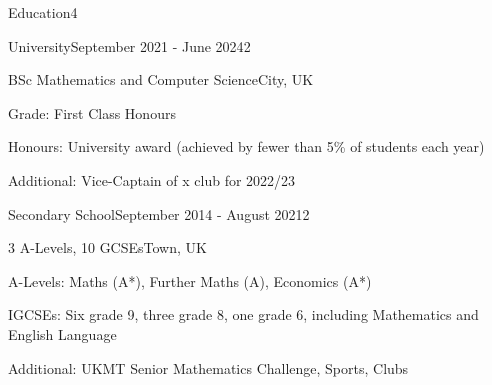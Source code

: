 \documentclass[10pt,a4paper]{CV}
\begin{document}

\begin{Section}{Education}{4}
    \begin{Institution}{University}{September 2021 - June 2024}{2}
        \begin{Position}{BSc Mathematics and Computer Science}{City, UK}
            \item Grade: First Class Honours
            \item Honours: University award (achieved by fewer than 5\% of students each year)
            \item Additional: Vice-Captain of x club for 2022/23
        \end{Position}
    \end{Institution}

    \begin{Institution}{Secondary School}{September 2014 - August 2021}{2}
        \begin{Position}{3 A-Levels, 10 GCSEs}{Town, UK}
            \item A-Levels: Maths (A*), Further Maths (A), Economics (A*)
            \item IGCSEs: Six grade 9, three grade 8, one grade 6, including Mathematics and English Language
            \item Additional: UKMT Senior Mathematics Challenge, Sports, Clubs
        \end{Position}
    \end{Institution}
\end{Section}
\end{document}
